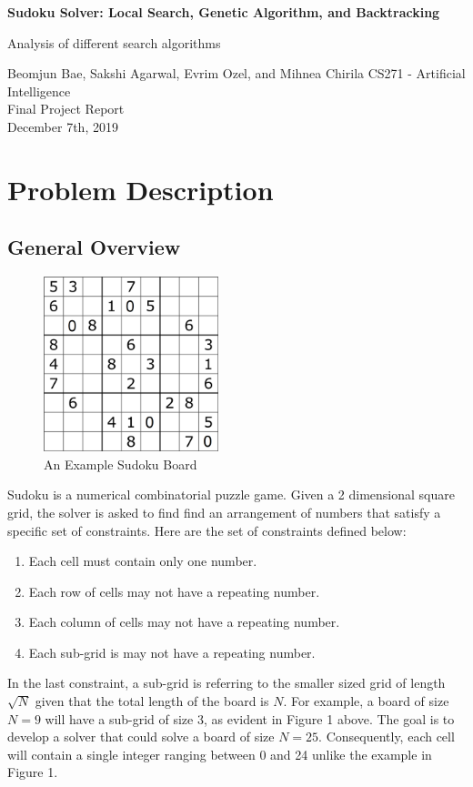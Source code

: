 \documentclass[12pt, a4paper]{article}
\begin{document}
	\begin{titlepage}
		\begin{center}
			\vspace*{7cm}
			\Huge
			\textbf{Sudoku Solver: Local Search, Genetic Algorithm, and Backtracking}
			
			\vspace{0.5cm}
			\large
			Analysis of different search algorithms
			
			\vspace{0.8cm}
			\large Beomjun Bae, Sakshi Agarwal, Evrim Ozel, and Mihnea Chirila
			\vfill
			CS271 - Artificial Intelligence\\
			Final Project Report\\
			December 7th, 2019
		\end{center}
	\end{titlepage}
	\section{Problem Description}
		\subsection{General Overview}
			\begin{figure}
				\begin{center}
					\centerline{\includegraphics[width=2in]{sample_9_by_9.png}}
				\end{center}
				\caption{An Example Sudoku Board}
			\end{figure}
			Sudoku is a numerical combinatorial puzzle game. Given a 2 dimensional square grid, the solver is asked to find find an arrangement of numbers that satisfy a specific set of constraints. Here are the set of constraints defined below:	
			\begin{enumerate}
				\item Each cell must contain only one number.
				\item Each row of cells may not have a repeating number.
				\item Each column of cells may not have a repeating number.
				\item Each sub-grid is may not have a repeating number.
			\end{enumerate}
			In the last constraint, a sub-grid is referring to the smaller sized grid of length $\sqrt{N}$ given that the total length of the board is $N$. For example, a board of size $N=9$ will have a sub-grid of size $3$, as evident in Figure 1 above. The goal is to develop a solver that could solve a board of size $N=25$. Consequently, each cell will contain a single integer ranging between 0 and 24 unlike the example in Figure 1.
\end{document}
